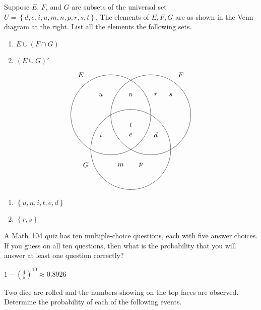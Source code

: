 \documentclass[addpoints,12pt]{exam}
\begin{document}
\begin{questions}

\begin{multicols}{2}
\question[10]
Suppose $E$, $F$, and $G$ are subsets
of the universal set $U=\left\{d,e,i,u,m,n,p,r,s,t\right\}$.
The elements of
$E,F,G$ are as shown in the Venn diagram
at the right.
List all the elements the following sets.
\begin{enumerate}
\item $E\cup\left(F\cap G\right)$
\item $\left(E\cup G\right)'$
\end{enumerate}
\[\begin{xy}<1cm,0cm>:
(-2.5,2)*{E};
(2.5,2)*{F};
(-2.25,-2.5)*{G};
(-1,0)*\cir<2cm>{};
(1,0)*\cir<2cm>{};
(0,-1.732)*\cir<2cm>{};
(-1.5,1)*{u};
(-1.5,-1)*{i};
(0,1)*{n};
(0,-.5)*{t};
(0,-1)*{e};
(1.25,1)*{r};
(1.25,-1)*{d};
(2,1)*{s};
(-.5,-2.5)*{m};
(.5,-2.5)*{p};
\end{xy}\]
\end{multicols}
\begin{solution}
\begin{enumerate}
\item $\left\{u,n,i,t,e,d\right\}$
\item $\left\{r,s\right\}$
\end{enumerate}
\end{solution}

\question[10] A Math~104 quiz has ten multiple-choice
questions, each with five answer choices. If you guess on all
ten questions, then what is the probability that you will answer at
least one question correctly?
\begin{solution}[1in]
$1-\left(\frac{4}{5}\right)^{10}\approx 0.8926$
\end{solution}
\ifprintanswers\else\newpage\fi

\question[16] Two dice are rolled and the
numbers showing on the top faces are observed.
Determine the probability of each of the following events.
\end{questions}
\end{document}
